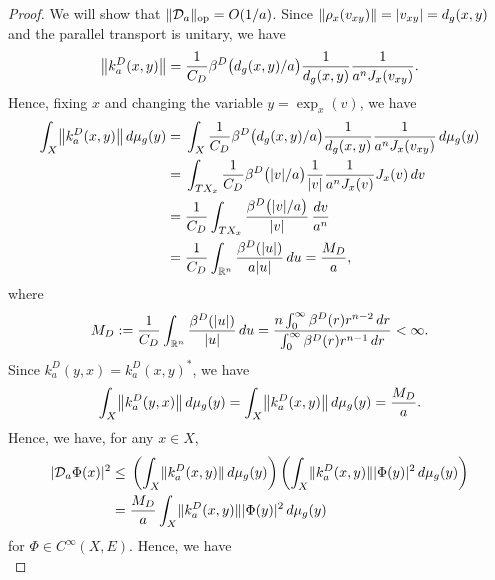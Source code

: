 \documentclass[a4paper,oneside,12pt]{amsart}
\theoremstyle{plain}
\theoremstyle{definition}
\theoremstyle{remark}
\newcommand{\R}{\mathbb{R}}
\DeclarePairedDelimiter{\abs}{\lvert}{\rvert}
\DeclarePairedDelimiter{\norm}{\lVert}{\rVert}
\newcommand{\dvol}{d\mu}
\newcommand{\cliffordmultiplication}{\rho}
\DeclarePairedDelimiter{\operatornorm}{\lVert}{\rVert_{\mathrm{op}}}
\newcommand{\mesoscopicDiracoperator}[1][a]{\mathcal{D}_{#1}}
\newcommand{\cutoff}{\beta}
\newcommand{\cutoffDirac}{\cutoff^D}
\newcommand{\integralkernel}{k}
\newcommand{\kernelDirac}{\integralkernel_a^D}
\begin{document}
\begin{proof}
  We will show that $\operatornorm{\mesoscopicDiracoperator} = O(1/a)$.
  Since $\norm{\cliffordmultiplication_x(v_{xy})} = \abs{v_{xy}} = d_g(x,y)$ and the parallel transport is unitary, we have
  \begin{equation}
    \norm*{\kernelDirac(x,y)} = \frac{1}{C_D} \cutoffDirac\big(d_g(x,y)/a\big) \frac{1}{d_g(x,y)} \frac{1}{a^nJ_x(v_{xy})}.
  \end{equation}
  Hence, fixing $x$ and changing the variable $y = \exp_x(v)$, we have
  \begin{equation}
    \begin{aligned}
    \int_X \norm*{\kernelDirac(x,y)} \,\dvol_g(y) ={}& \int_X \frac{1}{C_D} \cutoffDirac\big(d_g(x,y)/a\big) \frac{1}{d_g(x,y)} \frac{1}{a^nJ_x(v_{xy})} \,\dvol_g(y) \\
    ={}& \int_{TX_x} \frac{1}{C_D} \cutoffDirac\big(\abs{v}/a\big) \frac{1}{\abs{v}} \frac{1}{a^nJ_x(v)} J_x(v) \,dv \\
    ={}& \frac{1}{C_D} \int_{TX_x} \frac{\cutoffDirac\big(\abs{v}/a\big)}{\abs{v}} \,\frac{dv}{a^n} \\
    ={}& \frac{1}{C_D} \int_{\R^n} \frac{\cutoffDirac(\abs{u})}{a\abs{u}} \,du = \frac{M_D}{a},
    \end{aligned}
  \end{equation}
  where
  \begin{equation}
    M_D := \frac{1}{C_D} \int_{\R^n} \frac{\cutoffDirac(\abs{u})}{\abs{u}} \,du = \frac{n \int_0^{\infty} \cutoffDirac(r) r^{n-2} \,dr}{\int_0^{\infty} \cutoffDirac(r) r^{n-1} \,dr} < \infty.
  \end{equation}
  Since $\kernelDirac(y,x) = \kernelDirac(x,y)^*$, we have
  \begin{equation}
    \int_X \norm*{\kernelDirac(y,x)} \,\dvol_g(y) = \int_X \norm*{\kernelDirac(x,y)} \,\dvol_g(y) = \frac{M_D}{a}.
  \end{equation}
  Hence, we have, for any $x \in X$,
  \begin{equation}
    \begin{aligned}
    \abs{\mesoscopicDiracoperator \Phi(x)}^2 \le{}& \left( \int_X \norm{\kernelDirac(x,y)} \,\dvol_g(y) \right)\left( \int_X \norm{\kernelDirac(x,y)} \abs{\Phi(y)}^2 \,\dvol_g(y)\right) \\
    ={}& \frac{M_D}{a} \int_X \norm{\kernelDirac(x,y)} \abs{\Phi(y)}^2 \,\dvol_g(y)
    \end{aligned}
  \end{equation}
  for $\Phi \in C^{\infty}(X,E)$.
  Hence, we have
  \begin{equation}

\end{equation}
\end{proof}
\end{document}
